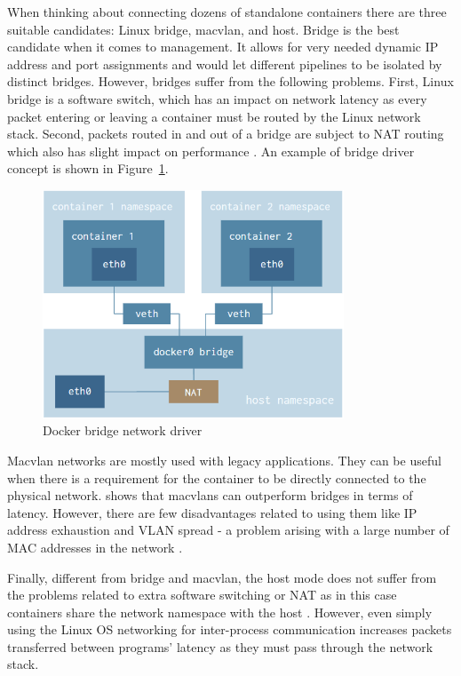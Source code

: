 \documentclass[english]{kththesis}
\begin{document}
When thinking about connecting dozens of standalone containers there are three suitable candidates: Linux bridge, macvlan, and host. Bridge is the best candidate when it comes to management. It allows for very needed dynamic IP address and port assignments and would let different pipelines to be isolated by distinct bridges. However, bridges suffer from the following problems. First, Linux bridge is a software switch, which has an impact on network latency as every packet entering or leaving a container must be routed by the Linux network stack. Second, packets routed in and out of a bridge are subject to NAT routing which also has slight impact on performance \cite{anderson_2016}. An example of bridge driver concept is shown in Figure~\ref{fig:bridge}.

\begin{figure}[!ht]
  \begin{center}
    \includegraphics[width=0.8\textwidth]{Fig3}
  \end{center}
  \caption{Docker bridge network driver}
  \label{fig:bridge}
\end{figure}

Macvlan networks are mostly used with legacy applications. They can be useful when there is a requirement for the container to be directly connected to the physical network. \cite{anderson_2016} shows that macvlans can outperform bridges in terms of latency. However, there are few disadvantages related to using them like IP address exhaustion and VLAN spread - a problem arising with a large number of MAC addresses in the network \cite{macvlan}.

Finally, different from bridge and macvlan, the host mode does not suffer from the problems related to extra software switching or NAT as in this case containers share the network namespace with the host \cite{host}. However, even simply using the Linux OS networking for inter-process communication increases packets transferred between programs' latency as they must pass through the network stack.
\end{document}
